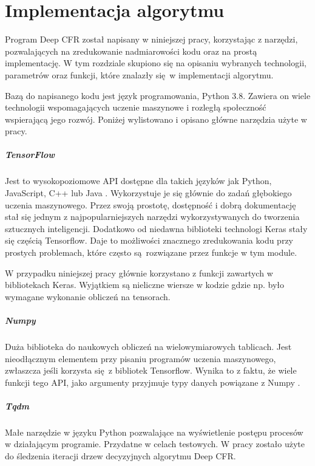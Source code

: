 \documentclass[12pt,oneside,a4paper]{report}
\begin{document}
\chapter{Implementacja algorytmu} 

Program Deep CFR został napisany w niniejszej pracy, korzystając z narzędzi,
pozwalających na zredukowanie nadmiarowości kodu oraz na prostą implementację.
W tym rozdziale skupiono się na opisaniu wybranych technologii, parametrów oraz funkcji, 
które znalazły się w implementacji algorytmu.

Bazą do napisanego kodu jest język programowania, Python 3.8. Zawiera on wiele
technologii wspomagających uczenie maszynowe i rozległą społeczność wspierającą jego rozwój.
Poniżej 
wylistowano i opisano główne narzędzia użyte w pracy.

\paragraph{TensorFlow}

Jest to wysokopoziomowe API dostępne dla takich języków jak Python, JavaScript, C++ lub Java
\cite{tensorflow}.
Wykorzystuje je się głównie do zadań głębokiego uczenia maszynowego. Przez swoją prostotę, dostępność 
i dobrą
dokumentację stał się jednym z najpopularniejszych narzędzi wykorzystywanych do tworzenia
sztucznych inteligencji. Dodatkowo od niedawna biblioteki technologi Keras stały się częścią Tensorflow.
Daje to możliwości znacznego
zredukowania kodu przy prostych problemach, które często są rozwiązane przez funkcje w tym module. 


W przypadku niniejszej pracy głównie korzystano z funkcji zawartych w bibliotekach Keras. Wyjątkiem 
są nieliczne wiersze w kodzie gdzie np. było wymagane wykonanie obliczeń na tensorach.

\paragraph{Numpy}

Duża biblioteka do naukowych obliczeń na wielowymiarowych tablicach. Jest nieodłącznym
elementem przy pisaniu programów uczenia maszynowego, zwłaszcza jeśli korzysta się z 
bibliotek Tensorflow. Wynika to z faktu, że wiele funkcji tego API, jako argumenty przyjmuje
typy danych powiązane z Numpy \cite{tensorflow}.



\paragraph{Tqdm}
Małe narzędzie w języku Python pozwalające na wyświetlenie postępu procesów w działającym 
programie.
Przydatne w celach
testowych. W pracy zostało użyte do śledzenia iteracji drzew decyzyjnych 
algorytmu Deep CFR.
\end{document}
